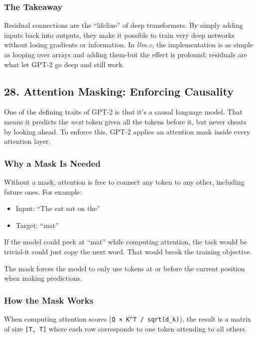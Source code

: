 \documentclass[
  letterpaper,
  DIV=11,
  numbers=noendperiod]{scrreprt}
\providecommand{\tightlist}{%
  \setlength{\itemsep}{0pt}\setlength{\parskip}{0pt}}
\begin{document}
\subsubsection{The Takeaway}\label{the-takeaway-16}

Residual connections are the ``lifeline'' of deep transformers. By
simply adding inputs back into outputs, they make it possible to train
very deep networks without losing gradients or information. In
\emph{llm.c}, the implementation is as simple as looping over arrays and
adding them-but the effect is profound: residuals are what let GPT-2 go
deep and still work.

\subsection{28. Attention Masking: Enforcing
Causality}\label{attention-masking-enforcing-causality}

One of the defining traits of GPT-2 is that it's a causal language
model. That means it predicts the \emph{next} token given all the tokens
before it, but never cheats by looking ahead. To enforce this, GPT-2
applies an attention mask inside every attention layer.

\subsubsection{Why a Mask Is Needed}\label{why-a-mask-is-needed}

Without a mask, attention is free to connect any token to any other,
including future ones. For example:

\begin{itemize}
\tightlist
\item
  Input: ``The cat sat on the''
\item
  Target: ``mat''
\end{itemize}

If the model could peek at ``mat'' while computing attention, the task
would be trivial-it could just copy the next word. That would break the
training objective.

The mask forces the model to only use tokens at or before the current
position when making predictions.

\subsubsection{How the Mask Works}\label{how-the-mask-works}

When computing attention scores (\texttt{Q\ ×\ K\^{}T\ /\ sqrt(d\_k)}),
the result is a matrix of size \texttt{{[}T,\ T{]}} where each row
corresponds to one token attending to all others.
\end{document}
